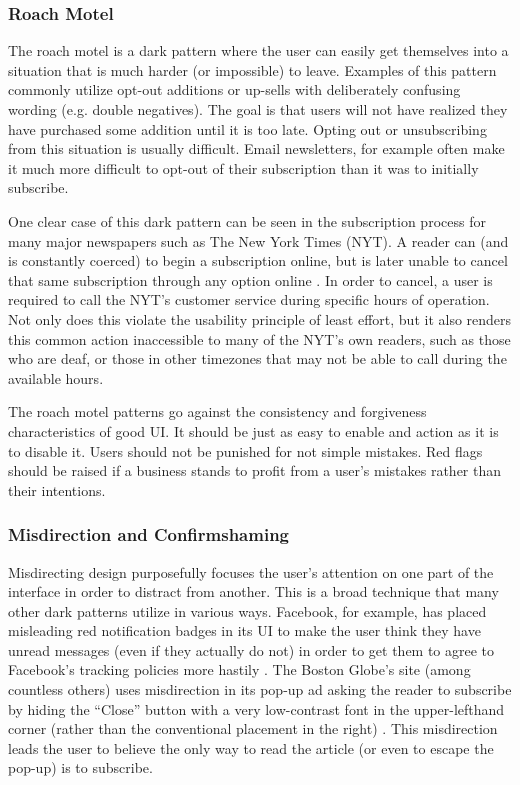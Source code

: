 \documentclass[12pt, oneside]{article}
\begin{document}
\subsubsection{Roach Motel}

The roach motel is a dark pattern where the user can easily get themselves into a situation that is much harder (or impossible) to leave. Examples of this pattern commonly utilize opt-out additions or up-sells with deliberately confusing wording (e.g. double negatives). The goal is that users will not have realized they have purchased some addition until it is too late. Opting out or unsubscribing from this situation is usually difficult. Email newsletters, for example often make it much more difficult to opt-out of their subscription than it was to initially subscribe.

One clear case of this dark pattern can be seen in the subscription process for many major newspapers such as The New York Times (NYT). A reader can (and is constantly coerced) to begin a subscription online, but is later unable to cancel that same subscription through any option online \cite{phillips_2016}. In order to cancel, a user is required to call the NYT's customer service during specific hours of operation. Not only does this violate the usability principle of least effort, but it also renders this common action inaccessible to many of the NYT's own readers, such as those who are deaf, or those in other timezones that may not be able to call during the available hours.

The roach motel patterns go against the consistency and forgiveness characteristics of good UI. It should be just as easy to enable and action as it is to disable it. Users should not be punished for not simple mistakes. Red flags should be raised if a business stands to profit from a user's mistakes rather than their intentions.

\subsubsection{Misdirection and Confirmshaming}

Misdirecting design purposefully focuses the user's attention on one part of the interface in order to distract from another. This is a broad technique that many other dark patterns utilize in various ways. Facebook, for example, has placed misleading red notification badges in its UI to make the user think they have unread messages (even if they actually do not) in order to get them to agree to Facebook's tracking policies more hastily \cite{irving_2018}. The Boston Globe's site (among countless others) uses misdirection in its pop-up ad asking the reader to subscribe by hiding the ``Close'' button with a very low-contrast font in the upper-lefthand corner (rather than the conventional placement in the right) \cite{vance_2016}. This misdirection leads the user to believe the only way to read the article (or even to escape the pop-up) is to subscribe.
\end{document}
